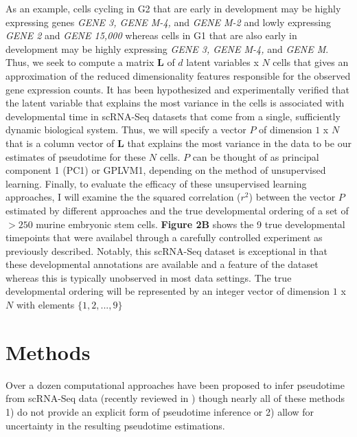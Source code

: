 \documentclass[english, 11pt]{article}\usepackage[]{graphicx}\usepackage[]{color}
\begin{document}
\noindent As an example, cells cycling in G2 that are early in development may be highly expressing genes \textit{GENE 3, GENE M-4,} and \textit{ GENE M-2} and lowly expressing \textit{GENE 2} and \textit{GENE 15,000} whereas cells in G1 that are also early in development may be highly expressing \textit{GENE 3, GENE M-4,} and \textit{GENE M}. Thus, we seek to compute a matrix $\mathbf{L}$ of $d$ latent variables x $N$ cells that gives an approximation of the reduced dimensionality features responsible for the observed gene expression counts. It has been hypothesized \cite{cannoodt2016computational} and experimentally verified \cite{lonnberg2017single} that the latent variable that explains the most variance in the cells is associated with developmental time in scRNA-Seq datasets that come from a single, sufficiently dynamic biological system. Thus, we will specify a vector $P$ of dimension $1$ x $N$ that is a column vector of $\mathbf{L}$ that explains the most variance in the data to be our estimates of pseudotime for these $N$ cells. $P$ can be thought of as principal component 1 (PC1) or GPLVM1, depending on the method of unsupervised learning.\newline\newline
Finally, to evaluate the efficacy of these unsupervised learning approaches, I will examine the the squared correlation ($r^2$) between the vector $P$ estimated by different approaches and the true developmental ordering of a set of $ > 250$ murine embryonic stem cells. \textbf{Figure 2B} shows the 9 true developmental timepoints that were availabel through a carefully controlled experiment as previously described. \cite{deng2014single} Notably, this scRNA-Seq dataset is exceptional in that these developmental annotations are available and a feature of the dataset whereas this is typically unobserved in most data settings. The true developmental ordering will be represented by an integer vector of dimension $1$ x $N$ with elements $\{ 1, 2, ..., 9\}$


\section{Methods}

Over a dozen computational approaches have been proposed to infer pseudotime from scRNA-Seq data (recently reviewed in \cite{cannoodt2016computational}) though nearly all of these methods 1) do not provide an explicit form of pseudotime inference or 2) allow for uncertainty in the resulting pseudotime estimations. 
\end{document}
